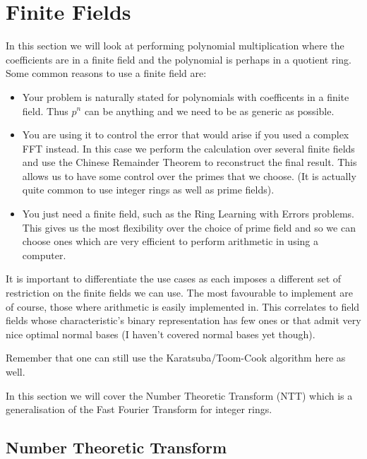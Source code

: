 \chapter{Finite Fields}\label{finite-fields}

In this section we will look at performing polynomial multiplication where the coefficients are in a finite field and the polynomial is perhaps in a quotient ring.\\

Some common reasons to use a finite field are:
\begin{itemize}
\item Your problem is naturally stated for polynomials with coefficents
in a finite field. Thus $p^n$ can be anything and we need to be as generic as possible.
\item You are using it to control the error that would arise if you used a complex FFT instead. In this case we perform the calculation over several finite fields and use the Chinese Remainder Theorem to reconstruct the final result. This allows us to have some control over the primes that we choose. (It is actually quite common to use integer rings as well as prime fields).
\item You just need a finite field, such as the Ring Learning with Errors problems. This gives us the most flexibility over the choice of prime field and so we can choose ones which are very efficient to perform arithmetic in using a computer.
\end{itemize}

It is important to differentiate the use cases as each imposes a different set of restriction on the finite fields we can use. The most favourable to implement are of course, those where arithmetic is easily implemented in. This correlates to field fields whose characteristic's binary representation has few ones or that admit very nice optimal normal bases (I haven't covered normal bases yet though).

Remember that one can still use the Karatsuba/Toom-Cook algorithm here as well.

In this section we will cover the Number Theoretic Transform (NTT) which is a generalisation of the Fast Fourier Transform for integer rings. 

\section{Number Theoretic Transform}
\label{sec:ntt}

